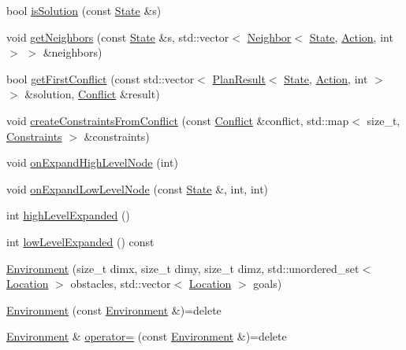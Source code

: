 \begin{DoxyCompactItemize}
\item 
bool \hyperlink{class_environment_aab14c04c6aaaf6b0d0f26f8b92d44400}{is\+Solution} (const \hyperlink{struct_state}{State} \&s)
\item 
void \hyperlink{class_environment_a4ae69480c6b9e716f282839dc4f323c0}{get\+Neighbors} (const \hyperlink{struct_state}{State} \&s, std\+::vector$<$ \hyperlink{structlib_multi_robot_planning_1_1_neighbor}{Neighbor}$<$ \hyperlink{struct_state}{State}, \hyperlink{a__star_8cpp_a8bb1ef53467e4f61410d12822d922498}{Action}, int $>$ $>$ \&neighbors)
\item 
bool \hyperlink{class_environment_a666d55a1f0bbc038d3662b75f400faa4}{get\+First\+Conflict} (const std\+::vector$<$ \hyperlink{structlib_multi_robot_planning_1_1_plan_result}{Plan\+Result}$<$ \hyperlink{struct_state}{State}, \hyperlink{a__star_8cpp_a8bb1ef53467e4f61410d12822d922498}{Action}, int $>$ $>$ \&solution, \hyperlink{struct_conflict}{Conflict} \&result)
\item 
void \hyperlink{class_environment_a532b4870bfa50eb350e037dc8aa06291}{create\+Constraints\+From\+Conflict} (const \hyperlink{struct_conflict}{Conflict} \&conflict, std\+::map$<$ size\+\_\+t, \hyperlink{struct_constraints}{Constraints} $>$ \&constraints)
\item 
void \hyperlink{class_environment_ad8d27db649c723053fe9d90d97c0e4cd}{on\+Expand\+High\+Level\+Node} (int)
\item 
void \hyperlink{class_environment_ad00ee2a501b1e78f19c86a0d01e49d52}{on\+Expand\+Low\+Level\+Node} (const \hyperlink{struct_state}{State} \&, int, int)
\item 
int \hyperlink{class_environment_a117b88b2a1e0267cfe28d0a6545af72d}{high\+Level\+Expanded} ()
\item 
int \hyperlink{class_environment_af870f6d7c69f7401f5d724b0ee60308f}{low\+Level\+Expanded} () const
\item 
\hyperlink{class_environment_a12b8baed8e6090b3eb528a27b1fecd0a}{Environment} (size\+\_\+t dimx, size\+\_\+t dimy, size\+\_\+t dimz, std\+::unordered\+\_\+set$<$ \hyperlink{struct_location}{Location} $>$ obstacles, std\+::vector$<$ \hyperlink{struct_location}{Location} $>$ goals)
\item 
\hyperlink{class_environment_abdb9fe9212fd5d47b5664df3e67c975f}{Environment} (const \hyperlink{class_environment}{Environment} \&)=delete
\item 
\hyperlink{class_environment}{Environment} \& \hyperlink{class_environment_a31a390fc46a51b9adab61b2511ef2a31}{operator=} (const \hyperlink{class_environment}{Environment} \&)=delete

\end{DoxyCompactItemize}
